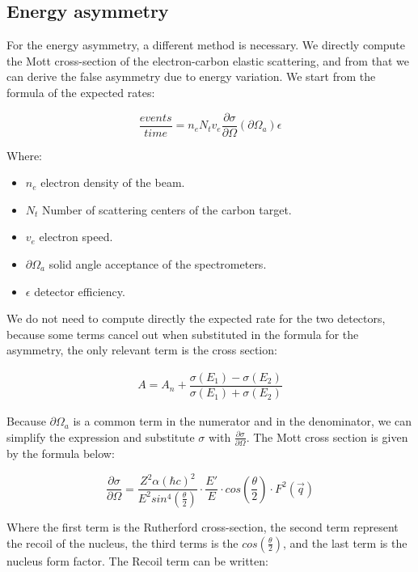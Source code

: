\subsection{Energy asymmetry}

For the energy asymmetry, a different method is necessary. We directly compute the Mott cross-section of the electron-carbon elastic scattering, and from that we can derive the false asymmetry due to energy variation.
We start from the formula of the expected rates:

\begin{equation}
\frac{events}{time} = n_{e} N_{t} v_{e} \frac{\partial \sigma}{\partial \Omega} (\partial \Omega_{a}) \epsilon 
\end{equation} 

Where:
\begin{itemize}
\item $n_{e}$ electron density of the beam.
\item $N_t$ Number of scattering centers of the carbon target.
\item $v_{e}$ electron speed.
\item $\partial \Omega_{a}$ solid angle acceptance of the spectrometers.
\item $\epsilon$ detector efficiency.
\end{itemize}

We do not need to compute directly the expected rate for the two detectors, because some terms cancel out when substituted in the formula for the asymmetry, the only relevant term is the cross section:

\begin{align*}
A = A_{n} + \dfrac{\sigma(E_{1}) - \sigma(E_{2})}{\sigma(E_{1}) + \sigma(E_{2})}
\end{align*}

Because $\partial \Omega_{a}$ is a common term in the numerator and in the denominator, we can simplify the expression and substitute $\sigma $ with $ \frac{\partial \sigma}{ \partial \Omega}$.
The Mott cross section is given by the formula below:

\begin{equation} \label{eq:Mott}
\dfrac{\partial \sigma}{\partial \Omega} = \dfrac{Z^{2} \alpha (\hbar c)^2}{E^{2} sin^{4}(\frac{\theta}{2})} \cdot \frac{E'}{E} \cdot  cos(\frac{\theta}{2}) \cdot F^{2}(\vec{q}) 
\end{equation}

Where the first term is the Rutherford cross-section, the second term represent the recoil of the nucleus, the third terms is the $cos(\frac{\theta}{2})$, and the last term is the nucleus form factor. The Recoil term can be written:

